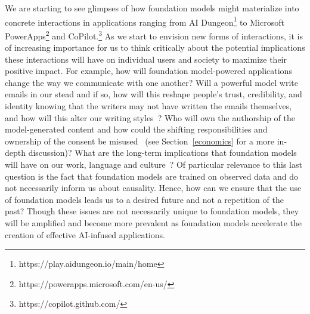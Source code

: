 We are starting to see glimpses of how foundation models might materialize into concrete interactions in applications ranging from AI Dungeon\footnote{https://play.aidungeon.io/main/home} to Microsoft PowerApps\footnote{https://powerapps.microsoft.com/en-us/} and CoPilot.\footnote{https://copilot.github.com/} As we start to envision new forms of interactions, it is of increasing importance for us to think critically about the potential implications these interactions will have on individual users and society to maximize their positive impact. For example, how will foundation model-powered applications change the way we communicate with one another? Will a powerful model write emails in our stead and if so, how will this reshape people's trust, credibility, and identity knowing that the writers may not have written the emails themselves, and how will this alter our writing styles~\citep{Hancock2020AI}? Who will own the authorship of the model-generated content and how could the shifting responsibilities and ownership of the consent be misused~\citep{Weiner2018} (see Section~\ref{economics} for a more in-depth discussion)? What are the long-term implications that foundation models will have on our work, language and culture~\citep{Hancock2020AI, Buschek2021writing}? Of particular relevance to this last question is the fact that foundation models are trained on observed data and do not necessarily inform us about causality. Hence, how can we ensure that the use of foundation models leads us to a desired future and not a repetition of the past? Though these issues are not necessarily unique to foundation models, they will be amplified and become more prevalent as foundation models accelerate the creation of effective AI-infused applications. 

